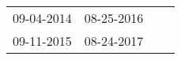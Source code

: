 \begin{supertabular}{llll}
 09-04-2014 &  08-25-2016 \\
 09-11-2015 &  08-24-2017 \\
\end{supertabular}

